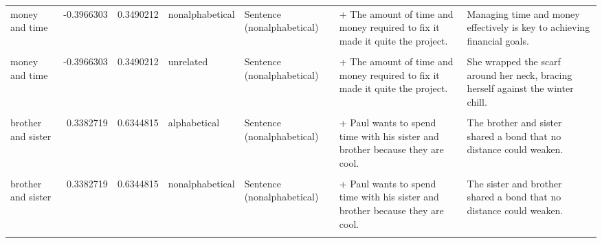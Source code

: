 \documentclass[
  12pt,
]{scrartcl}
\begin{document}
\begin{landscape}
\begin{longtable}{lrrllll}
money and time & -0.3966303 & 0.3490212 & nonalphabetical & Sentence (nonalphabetical) & + The amount of time and money required to fix it made it quite the project. & Managing time and money effectively is key to achieving financial goals.\\
\cellcolor{gray!6}{money and time} & \cellcolor{gray!6}{-0.3966303} & \cellcolor{gray!6}{0.3490212} & \cellcolor{gray!6}{unrelated} & \cellcolor{gray!6}{Sentence (alphabetical)} & \cellcolor{gray!6}{+ The amount of money and time required to fix it made it quite the project.} & \cellcolor{gray!6}{She wrapped the scarf around her neck, bracing herself against the winter chill.}\\
\addlinespace
money and time & -0.3966303 & 0.3490212 & unrelated & Sentence (nonalphabetical) & + The amount of time and money required to fix it made it quite the project. & She wrapped the scarf around her neck, bracing herself against the winter chill.\\
\cellcolor{gray!6}{brother and sister} & \cellcolor{gray!6}{0.3382719} & \cellcolor{gray!6}{0.6344815} & \cellcolor{gray!6}{alphabetical} & \cellcolor{gray!6}{Sentence (alphabetical)} & \cellcolor{gray!6}{+ Paul wants to spend time with his brother and sister because they are cool.} & \cellcolor{gray!6}{The brother and sister shared a bond that no distance could weaken.}\\
brother and sister & 0.3382719 & 0.6344815 & alphabetical & Sentence (nonalphabetical) & + Paul wants to spend time with his sister and brother because they are cool. & The brother and sister shared a bond that no distance could weaken.\\
\cellcolor{gray!6}{brother and sister} & \cellcolor{gray!6}{0.3382719} & \cellcolor{gray!6}{0.6344815} & \cellcolor{gray!6}{nonalphabetical} & \cellcolor{gray!6}{Sentence (alphabetical)} & \cellcolor{gray!6}{+ Paul wants to spend time with his brother and sister because they are cool.} & \cellcolor{gray!6}{The sister and brother shared a bond that no distance could weaken.}\\
brother and sister & 0.3382719 & 0.6344815 & nonalphabetical & Sentence (nonalphabetical) & + Paul wants to spend time with his sister and brother because they are cool. & The sister and brother shared a bond that no distance could weaken.\\
\addlinespace
\cellcolor{gray!6}{brother and sister} & \cellcolor{gray!6}{0.3382719} & \cellcolor{gray!6}{0.6344815} & \cellcolor{gray!6}{unrelated} & \cellcolor{gray!6}{Sentence (alphabetical)} & \cellcolor{gray!6}{+ Paul wants to spend time with his brother and sister because they are cool.} & \cellcolor{gray!6}{The cat curled up on the windowsill, basking in a patch of warm sunlight.}\\

\end{longtable}
\end{landscape}
\end{document}
